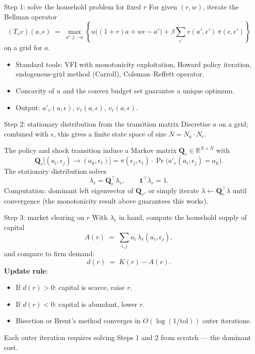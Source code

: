 \begin{frame}{Step 1: solve the household problem for fixed $r$}
For given $(r,w)$, iterate the Bellman operator
\[
(T_r v)(a,\epsilon) \;=\; \max_{a' \geq -\underline{a}}\!\left\{u\big((1+r)a + w\epsilon - a'\big) + \beta \sum_{\epsilon'} v(a',\epsilon')\,\pi(\epsilon,\epsilon')\right\}
\]
on a grid for $a$.
\medskip
\begin{itemize}
\item Standard tools: VFI with monotonicity exploitation, Howard policy iteration, endogenous-grid method (Carroll), Coleman--Reffett operator.
\medskip
\item Concavity of $u$ and the convex budget set guarantee a unique optimum.
\medskip
\item Output: $a'_r(a,\epsilon)$, $c_r(a,\epsilon)$, $v_r(a,\epsilon)$.
\end{itemize}
\end{frame}

\begin{frame}{Step 2: stationary distribution from the transition matrix}
Discretise $a$ on a grid; combined with $\epsilon$, this gives a finite state space of size $N = N_a \cdot N_\epsilon$.
\medskip

The policy and shock transition induce a Markov matrix $\mathbf{Q}_r \in \mathbb{R}^{N\times N}$ with
\[
\mathbf{Q}_r\big[(a_i,\epsilon_j) \to (a_k,\epsilon_\ell)\big]
= \pi(\epsilon_j,\epsilon_\ell)\cdot\Pr\!\big(a'_r(a_i,\epsilon_j) = a_k\big).
\]
\medskip
The stationary distribution solves
\[
\lambda_r = \mathbf{Q}_r^\top \lambda_r, \qquad \mathbf{1}^\top \lambda_r = 1.
\]
\medskip
Computation: dominant left eigenvector of $\mathbf{Q}_r$, or simply iterate $\lambda \leftarrow \mathbf{Q}_r^\top \lambda$ until convergence (the monotonicity result above guarantees this works).
\end{frame}

\begin{frame}{Step 3: market clearing on $r$}
With $\lambda_r$ in hand, compute the household supply of capital
\[
A(r) \;=\; \sum_{i,j} a_i \,\lambda_r(a_i,\epsilon_j),
\]
and compare to firm demand:
\[
d(r) \;=\; K(r) - A(r).
\]
\medskip
\textbf{Update rule}:
\begin{itemize}
\item If $d(r) > 0$: capital is scarce, raise $r$.
\item If $d(r) < 0$: capital is abundant, lower $r$.
\item Bisection or Brent's method converges in $O(\log(1/\text{tol}))$ outer iterations.
\end{itemize}
\medskip
Each outer iteration requires solving Steps 1 and 2 from scratch --- the dominant cost.
\end{frame}

